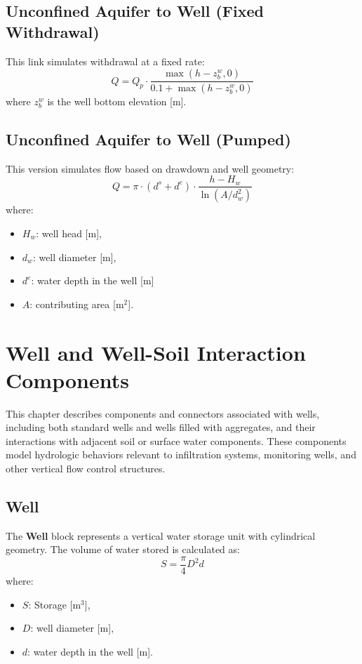 \documentclass[12pt]{report}
\begin{document}
\section{Unconfined Aquifer to Well (Fixed Withdrawal)}

This link simulates withdrawal at a fixed rate:
\begin{equation}
Q = Q_p \cdot \frac{\max(h - z_b^w, 0)}{0.1 + \max(h - z_b^w, 0)}
\end{equation}
where $z_b^w$ is the well bottom elevation [m].

\section{Unconfined Aquifer to Well (Pumped)}

This version simulates flow based on drawdown and well geometry:
\begin{equation}
Q = \pi \cdot (d^s + d^e) \cdot \frac{h - H_w}{\ln(A / d_w^2)}
\end{equation}
where:
\begin{itemize}
\item $H_w$: well head [m],
\item $d_w$: well diameter [m],
\item $d^e$: water depth in the well [m]
\item $A$: contributing area [m$^2$].
\end{itemize}

\FloatBarrier

\chapter{Well and Well-Soil Interaction Components}

This chapter describes components and connectors associated with wells, including both standard wells and wells filled with aggregates, and their interactions with adjacent soil or surface water components. These components model hydrologic behaviors relevant to infiltration systems, monitoring wells, and other vertical flow control structures.

\section{Well}
The \textbf{Well} block represents a vertical water storage unit with cylindrical geometry. The volume of water stored is calculated as:
\begin{equation}
S = \frac{\pi}{4} D^2 d
\end{equation}
where:
\begin{itemize}
\item $S$: Storage [m$^3$],
\item $D$: well diameter [m],
\item $d$: water depth in the well [m].
\end{itemize}
\end{document}
